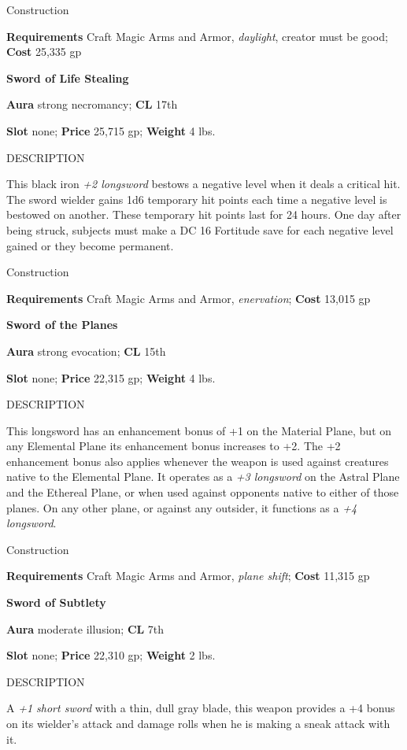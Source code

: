 Construction
				
\textbf{Requirements} Craft Magic Arms and Armor, \textit{daylight}, creator must be good; \textbf{Cost }25,335 gp
				
\textbf{Sword of Life Stealing}
				
\textbf{Aura} strong necromancy;\textbf{ CL }17th
				
\textbf{Slot} none; \textbf{Price} 25,715 gp; \textbf{Weight} 4 lbs.
				
DESCRIPTION
				
This black iron \textit{+2 longsword} bestows a negative level when it deals a critical hit. The sword wielder gains 1d6 temporary hit points each time a negative level is bestowed on another. These temporary hit points last for 24 hours. One day after being struck, subjects must make a DC 16 Fortitude save for each negative level gained or they become permanent. 
				
Construction
				
\textbf{Requirements} Craft Magic Arms and Armor, \textit{enervation}; \textbf{Cost }13,015 gp
				
\textbf{Sword of the Planes}
				
\textbf{Aura} strong evocation;\textbf{ CL }15th
				
\textbf{Slot} none; \textbf{Price} 22,315 gp; \textbf{Weight} 4 lbs.
				
DESCRIPTION
				
This longsword has an enhancement bonus of +1 on the Material Plane, but on any Elemental Plane its enhancement bonus increases to +2. The +2 enhancement bonus also applies whenever the weapon is used against creatures native to the Elemental Plane. It operates as a \textit{+3 longsword} on the Astral Plane and the Ethereal Plane, or when used against opponents native to either of those planes. On any other plane, or against any outsider, it functions as a \textit{+4 longsword}. 
				
Construction
				
\textbf{Requirements} Craft Magic Arms and Armor, \textit{plane shift}; \textbf{Cost }11,315 gp
				
\textbf{Sword of Subtlety}
				
\textbf{Aura} moderate illusion;\textbf{ CL }7th
				
\textbf{Slot} none; \textbf{Price} 22,310 gp; \textbf{Weight} 2 lbs.
				
DESCRIPTION
				
A \textit{+1 short sword} with a thin, dull gray blade, this weapon provides a +4 bonus on its wielder's attack and damage rolls when he is making a sneak attack with it. 
				
